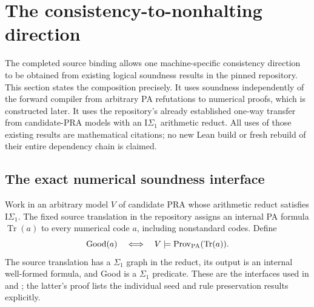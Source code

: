 \section{The consistency-to-nonhalting direction}
\label{sec:consistency-nonhalting}

The completed source binding allows one machine-specific consistency
direction to be obtained from existing logical soundness results in the
pinned repository.  This section states the composition precisely.  It
uses soundness independently of the forward compiler from arbitrary PA
refutations to numerical proofs, which is constructed later.  It uses the repository's already established
one-way transfer from candidate-PRA models with an $\mathrm I\Sigma_1$
arithmetic reduct.  All uses of those existing results are mathematical
citations; no new Lean build or fresh rebuild of their entire dependency
chain is claimed.

\subsection{The exact numerical soundness interface}

Work in an arbitrary model $V$ of candidate PRA whose arithmetic reduct
satisfies $\mathrm I\Sigma_1$.  The fixed source translation in the
repository assigns an internal PA formula $\operatorname{Tr}(a)$ to
every numerical code $a$, including nonstandard codes.  Define
\[
 \operatorname{Good}(a)\quad\Longleftrightarrow\quad
 V\models\operatorname{Prov}_{\mathrm{PA}}(\operatorname{Tr}(a)).
\]
The source translation has a $\Sigma_1$ graph in the reduct, its output
is an internal well-formed formula, and Good is a $\Sigma_1$ predicate.
These are the interfaces used in
 and
; the latter's
 proof lists the individual seed and rule
preservation results explicitly\cite{reverse-source}.

